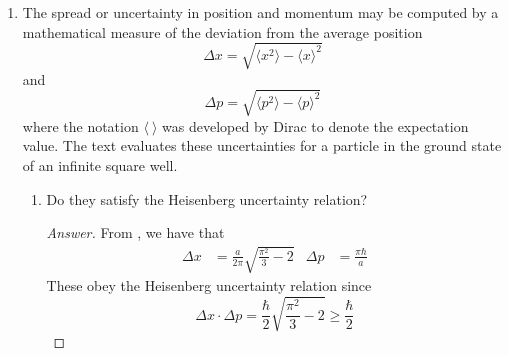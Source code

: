 \documentclass[../psets.tex]{subfiles}
\begin{document}
\begin{enumerate}
\begin{enumerate}
\begin{proof}[Answer]
\begin{center}
            \end{center}
        \end{proof}
        \item As the quantum state $n$ of the particle approaches infinity, the energy and frequency of the particle become very large. What happens to the probability $P(x)$ of finding this quantum particle as a function of its position in the box?
        \begin{proof}[Answer]
            The probability $P(x)$ becomes more evenly distributed throughout the box, so the particle behaves more classically.
        \end{proof}
    \end{enumerate}
    \item The spread or uncertainty in position and momentum may be computed by a mathematical measure of the deviation from the average position
    \begin{equation}
        \Delta x = \sqrt{\langle x^2\rangle-\langle x\rangle^2}
    \end{equation}
    and
    \begin{equation}
        \Delta p = \sqrt{\langle p^2\rangle-\langle p\rangle^2}
    \end{equation}
    where the notation $\langle\ \rangle$ was developed by Dirac to denote the expectation value. The text evaluates these uncertainties for a particle in the ground state of an infinite square well.
    \begin{enumerate}
        \item Do they satisfy the Heisenberg uncertainty relation?
        \begin{proof}[Answer]
            From \textcite{bib:McQuarrieSimon}, we have that
            \begin{align*}
                \Delta x &= \frac{a}{2\pi}\sqrt{\frac{\pi^2}{3}-2}&
                \Delta p &= \frac{\pi\hbar}{a}
            \end{align*}
            These  obey the Heisenberg uncertainty relation since
            \begin{equation*}
                \Delta x\cdot\Delta p = \frac{\hbar}{2}\sqrt{\frac{\pi^2}{3}-2} \geq \frac{\hbar}{2}
            \end{equation*}
        \end{proof}

\end{enumerate}
\end{enumerate}
\end{document}
